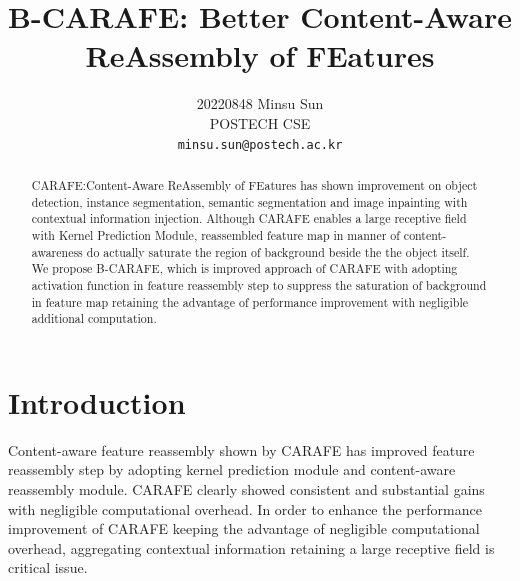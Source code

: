 \documentclass[10pt,twocolumn,letterpaper]{article}
\begin{document}
\title{B-CARAFE: Better Content-Aware ReAssembly of FEatures}

\author{20220848 Minsu Sun\\
POSTECH CSE\\
{\tt\small minsu.sun@postech.ac.kr}
}
\maketitle

\begin{abstract}
CARAFE:Content-Aware ReAssembly of FEatures\cite{CARAFE} has shown improvement on object detection, instance segmentation, semantic segmentation and image inpainting with contextual information injection.
Although CARAFE enables a large receptive field with Kernel Prediction Module, reassembled feature map in manner of content-awareness do actually saturate the region of background beside the the object itself.
We propose B-CARAFE, which is improved approach of CARAFE with adopting activation function in feature reassembly step to suppress the saturation of background in feature map retaining the advantage of performance improvement with negligible additional computation.
\end{abstract}

\section{Introduction}
\label{sec:intro}
Content-aware feature reassembly shown by CARAFE\cite{CARAFE} has improved feature reassembly step by adopting kernel prediction module and content-aware reassembly module.
CARAFE clearly showed consistent and substantial gains with negligible computational overhead.
In order to enhance the performance improvement of CARAFE keeping the advantage of negligible computational overhead, aggregating contextual information retaining a large receptive field is critical issue.
\end{document}
